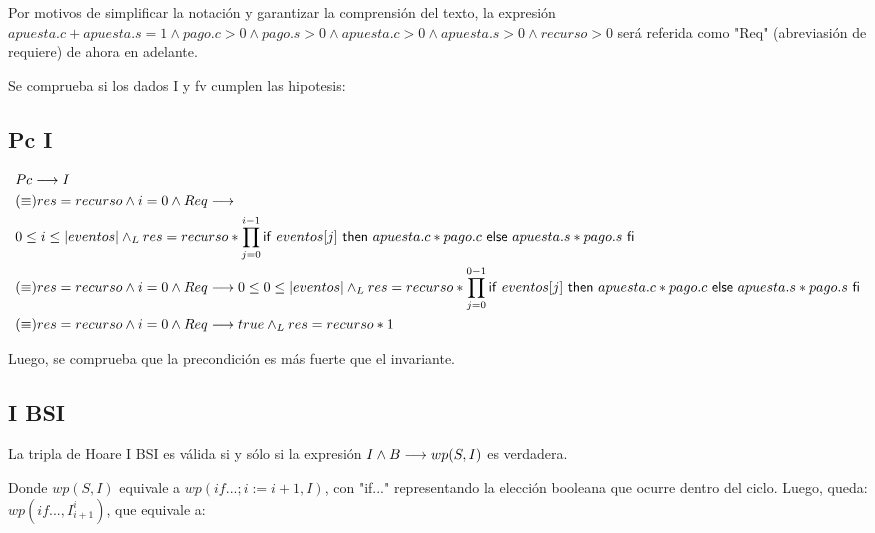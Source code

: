 \documentclass[10pt,a4paper]{article}
\begin{document}
 Por motivos de simplificar la notación y garantizar la comprensión del texto, la expresión
 $apuesta.c + apuesta.s = 1 \land pago.c > 0 \land pago.s > 0 \land apuesta.c > 0 \land apuesta.s > 0 \land recurso > 0$
 será referida como "Req" (abreviasión de requiere) de ahora en adelante.
 
\vspace{0.3cm}

 Se comprueba si los dados I y fv cumplen las hipotesis:

\subsection{Pc \implica I}

\begin{equation} %
\begin{split} 
	& Pc \implica I \\
	& (\equiv) res = recurso \land i = 0 \land Req  \implica \\
	& 0 \leq i \leq \longitud{eventos} \yLuego 
	res = recurso * \prod\limits_{j=0}^{i-1} \IfThenElse{eventos[j]}{apuesta.c * pago.c}{apuesta.s * pago.s}\\

	& (\equiv) res = recurso \land i = 0 \land Req \implica 
	0 \leq 0 \leq \longitud{eventos} \yLuego res = recurso * \prod\limits_{j=0}^{0-1} \IfThenElse{eventos[j]}{apuesta.c * pago.c}{apuesta.s * pago.s}\\

	& (\equiv) res = recurso \land i = 0 \land Req \implica 
	true \yLuego res = recurso * 1
\end{split} 
\end{equation}

 Luego, se comprueba que la precondición es más fuerte que el invariante.

\subsection{{I \land B}S{I}}
 La tripla de Hoare {I \land B}S{I} es válida si y sólo si la expresión $I \land B \longrightarrow wp(S,I)$ es verdadera.

\vspace{0.3cm}

 Donde $wp(S,I)$ equivale a $wp(if...; i:= i + 1, I)$, con "if..." representando la elección booleana que ocurre dentro del ciclo.
 Luego, queda: $wp(if..., I^{i}_{i+1})$, que equivale a:
\end{document}
